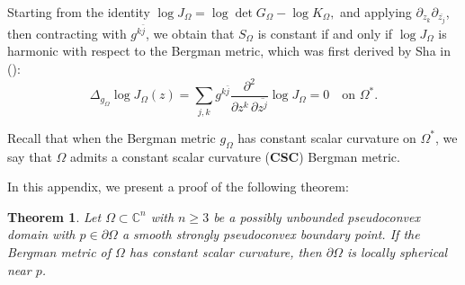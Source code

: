 \documentclass[a4paper,centertags,oneside,12pt]{amsart}
\newtheorem{theorem}{Theorem}[section]
\numberwithin{equation}{section}
\begin{document}
Starting from the identity
$ 
\log J_\Omega = \log \det G_\Omega - \log K_\Omega,
$ 
and applying \( \partial_{z_k} \partial_{\overline{z_j}} \), then contracting with \( g^{k\bar{j}} \), we obtain that \( S_{\Omega} \) is constant if and only if \( \log J_\Omega \) is harmonic with respect to the Bergman metric, which was first derived by Sha in  (\cite{Sh26}):
\[
\Delta_{g_\Omega} \log J_\Omega (z)
=
\sum_{j,k} g^{k\bar{j}}
\frac{\partial^2}{\partial z^k \,\partial \overline{z^j}} \log J_\Omega=0
\quad \text{on } \Omega^*.
\]

Recall that when  the Bergman metric \( g_\Omega \) has constant scalar curvature on \( \Omega^* \), we say that \( \Omega \) admits a constant scalar curvature ({\bf CSC}) Bergman metric.


In this appendix, we present a   proof of  the following theorem:
\begin{theorem} \label{main thm-appendix}
Let $\Omega
\subset {\mathbb C}^n$ with $n\ge 3$ be a possibly unbounded pseudoconvex domain with $p\in \partial\Omega$ a  smooth strongly pseudoconvex  boundary point. If the Bergman metric of $\Omega$  has  constant scalar curvature,  then $\partial\Omega$ is locally spherical near $p$.
\end{theorem}
\end{document}
